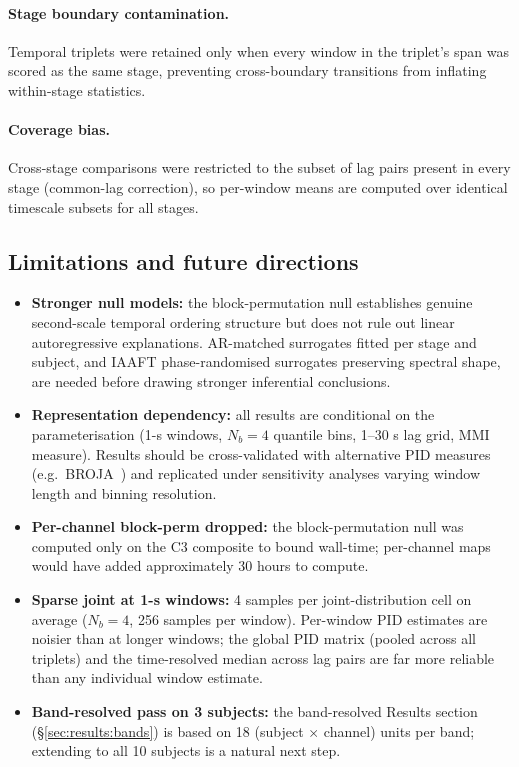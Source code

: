 \documentclass[11pt,a4paper]{article}
\begin{document}
\paragraph{Stage boundary contamination.}
Temporal triplets were retained only when every window in the triplet's
span was scored as the same stage, preventing cross-boundary transitions
from inflating within-stage statistics.

\paragraph{Coverage bias.}
Cross-stage comparisons were restricted to the subset of lag pairs
present in every stage (common-lag correction), so per-window means are
computed over identical timescale subsets for all stages.

\subsection{Limitations and future directions}
\label{sec:limitations}

\begin{itemize}
  \item \textbf{Stronger null models:} the block-permutation null
    establishes genuine second-scale temporal ordering structure but does
    not rule out linear autoregressive explanations.  AR-matched
    surrogates fitted per stage and subject, and IAAFT phase-randomised
    surrogates preserving spectral shape, are needed before drawing
    stronger inferential conclusions.

  \item \textbf{Representation dependency:} all results are conditional
    on the parameterisation (1-s windows, $N_b = 4$ quantile bins,
    1--30 s lag grid, MMI measure).  Results should be cross-validated
    with alternative PID measures
    (e.g.\ BROJA~\citep{bertschinger2014quantifying}) and replicated
    under sensitivity analyses varying window length and binning
    resolution.

  \item \textbf{Per-channel block-perm dropped:} the block-permutation
    null was computed only on the C3 composite to bound wall-time;
    per-channel maps would have added approximately 30 hours to compute.

  \item \textbf{Sparse joint at 1-s windows:} 4 samples per joint-distribution
    cell on average ($N_b = 4$, 256 samples per window).  Per-window PID
    estimates are noisier than at longer windows; the global PID matrix
    (pooled across all triplets) and the time-resolved median across lag
    pairs are far more reliable than any individual window estimate.

  \item \textbf{Band-resolved pass on 3 subjects:} the band-resolved
    Results section (\S\ref{sec:results:bands}) is based on 18
    (subject $\times$ channel) units per band; extending to all 10
    subjects is a natural next step.
\end{itemize}
\end{document}
